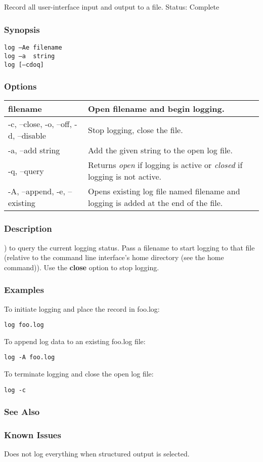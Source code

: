 \subsection{}
\label{log}
Record all user-interface input and output to a file. 
 Status: Complete
\subsubsection*{Synopsis}
\begin{verbatim}
log –Ae filename
log –a  string
log [–cdoq]
\end{verbatim}
\subsubsection*{Options}
\begin{tabular}{|l|l|}
\hline 
 filename  & Open filename and begin logging.  \\
 \hline 
 -c, --close, -o, --off, -d, --disable  & Stop logging, close the file.  \\
 \hline 
 -a, --add string  & Add the given string to the open log file.  \\
 \hline 
 -q, --query  & Returns \emph{open}
 if logging is active or \emph{closed}
 if logging is not active.  \\
 \hline 
 -A, --append, -e, --existing  & Opens existing log file named filename and logging is added at the end of the file.  \\
 \hline 
\end{tabular}
\subsubsection*{Description}
) to query the current logging status. Pass a filename to start logging to that file (relative to the command line interface's home directory (see the home command)). Use the \textbf{close}
 option to stop logging. 
\subsubsection*{Examples}
 To initiate logging and place the record in foo.log: \begin{verbatim}
log foo.log
\end{verbatim}
 To append log data to an existing foo.log file: \begin{verbatim}
log -A foo.log
\end{verbatim}
 To terminate logging and close the open log file: \begin{verbatim}
log -c
\end{verbatim}
\subsubsection*{See Also}
\subsubsection*{Known Issues}
 Does not log everything when structured output is selected. 
